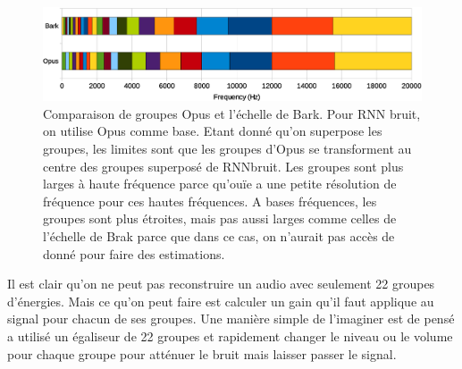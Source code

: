 \documentclass[conference,onecolumn]{IEEEtran}
\begin{document}
 \begin{figure}[H]
 \centering
    \includegraphics[scale=0.25]{bands.png}
    \caption{Comparaison de groupes Opus et l’échelle de Bark. Pour RNN bruit, on utilise Opus comme base. Etant donné qu’on superpose les groupes, les limites sont que les groupes d’Opus se transforment au centre des groupes superposé de RNNbruit. Les groupes sont plus larges à haute fréquence parce qu’ouïe a une petite résolution de fréquence pour ces hautes fréquences. A bases fréquences, les groupes sont plus étroites, mais pas aussi larges comme celles de l’échelle de Brak parce que dans ce cas, on n’aurait pas accès de donné pour faire des estimations.} 
\end{figure}
Il est clair qu’on ne peut pas reconstruire un audio avec seulement 22 groupes d’énergies. Mais ce qu’on peut faire est calculer un gain qu’il faut applique au signal pour chacun de ses groupes. Une manière simple de l’imaginer est de pensé a utilisé un égaliseur de 22 groupes et rapidement changer le niveau ou le volume pour chaque groupe pour atténuer le bruit mais laisser passer le signal. 
\end{document}
